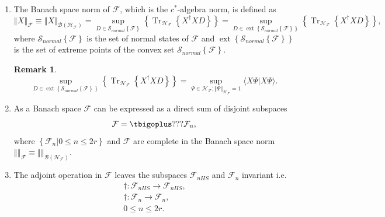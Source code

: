 \documentclass[aps, preprint]{revtex4}
\newtheorem{remark}[theorem]{Remark}
\begin{document}
\begin{enumerate}
\item The Banach space norm of $\mathcal{F}$, which is the $c^{ \ast }$-algebra norm, is defined as
\begin{equation}\left \Vert X\right \Vert _{\mathcal{F}} \equiv \left \Vert X\right \Vert _{\mathcal{B} \left (\mathcal{H}_{\mathcal{F}}\right )} =\sup_{D \in \mathcal{S}_{n o r m a l} \left \{\mathcal{F}\right \}}\left \{\ensuremath{\operatorname*{Tr}}_{\mathcal{H}_{\mathcal{F}}} \left \{X^{ \dag } X D\right \}\right \} =\sup_{D \in \ensuremath{\operatorname*{ext}}\left \{\mathcal{S}_{n o r m a l} \left \{\mathcal{F}\right \}\right \}}\left \{\ensuremath{\operatorname*{Tr}}_{\mathcal{H}_{\mathcal{F}}} \left \{X^{ \dag } X D\right \}\right \}\text{,}
\end{equation}where $\mathcal{S}_{n o r m a l} \left \{\mathcal{F}\right \}$ is the set of normal states of $\mathcal{F}$ and $\ensuremath{\operatorname*{ext}}\left \{\mathcal{S}_{n o r m a l} \left \{\mathcal{F}\right \}\right \}$ is the set of extreme points of the convex set $\mathcal{S}_{n o r m a l} \left \{\mathcal{F}\right \}\text{.}$ 


\begin{remark}
\begin{equation}\sup_{D \in \ensuremath{\operatorname*{ext}}\left \{\mathcal{S}_{n o r m a l} \left \{\mathcal{F}\right \}\right \}}\left \{\ensuremath{\operatorname*{Tr}}_{\mathcal{H}_{\mathcal{F}}} \left \{X^{ \dag } X D\right \}\right \} =\sup_{\Psi  \in \mathcal{H}_{\mathcal{F}} ;\left \Vert \Psi \right \Vert _{\mathcal{H}_{\mathcal{F}}} =1} \langle \left .X \Psi \right \vert X \Psi  \rangle \text{.}
\end{equation}
\end{remark}

\item As a Banach space $\mathcal{F}$ can be expressed as a direct sum of disjoint subspaces
\begin{equation}\mathcal{F} =\tbigoplus ???\mathcal{F}_{n}\text{,}
\end{equation}where $\left \{\left .\mathcal{F}_{n}\right \vert 0 \leq n \leq 2 r\right \}$ and $\mathcal{F}$ are complete in the Banach space norm $\left \Vert \text{}\right \Vert _{\mathcal{F}} \equiv \left \Vert \text{}\right \Vert _{\mathcal{B} \left (\mathcal{H}_{\mathcal{F}}\right )}\text{.}$ 

\item The adjoint operation in $\mathcal{F}$ leaves the subspaces $\mathcal{F}_{n H S}$ and $\mathcal{F}_{n}$ invariant i.e.
\begin{gather} \dag  :\mathcal{F}_{n H S} \rightarrow \mathcal{F}_{n H S}\text{,} \\
 \dag  :\mathcal{F}_{n} \rightarrow \mathcal{F}_{n} ,\, \\
0 \leq n \leq 2 r\text{.}\end{gather}\end{enumerate}
\end{document}
